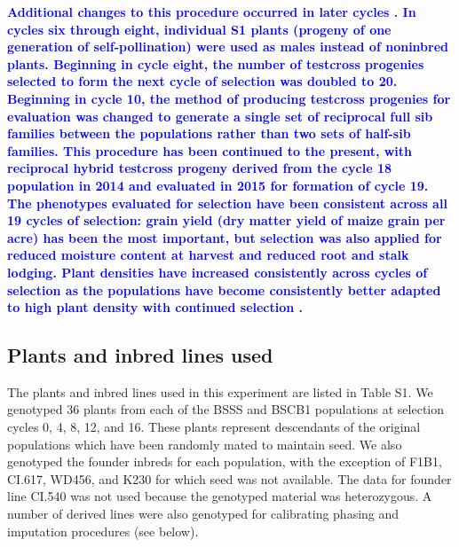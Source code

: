 \documentclass[twocolumn,twoside,letterpaper]{article}
\newcommand{\rev}[1]{\textcolor{blue}{\bf #1}}
\begin{document}
\rev{Additional changes to this procedure occurred in later cycles \citep{penny1971twenty,keeratinijakal1993responses}.
In cycles six through eight, individual S1 plants (progeny of one generation of self-pollination) were used as males instead of noninbred plants.  
Beginning in cycle eight, the number of testcross progenies selected to form the next cycle of selection was doubled to 20.  
Beginning in cycle 10, the method of producing testcross progenies for evaluation was changed to generate a single set of reciprocal full sib families between the populations rather than two sets of half-sib families. %
This procedure has been continued to the present, with reciprocal hybrid testcross progeny derived from the cycle 18 population in 2014 and evaluated in 2015 for formation of cycle 19.  
The phenotypes evaluated for selection have been consistent across all 19 cycles of selection: grain yield (dry matter yield of maize grain per acre) has been the most important, but selection was also applied for reduced moisture content at harvest and reduced root and stalk lodging.  
Plant densities have increased consistently across cycles of selection as the populations have become consistently better adapted to high plant density with continued selection \citep{brekke2011selection}.}

\subsection*{Plants and inbred lines used}
The plants and inbred lines used in this experiment are listed in Table S1. 
We genotyped 36 plants from each of the BSSS and BSCB1 populations at selection cycles 0, 4, 8, 12, and 16. 
These plants represent descendants of the original populations which have been randomly mated to maintain seed. 
We also genotyped the founder inbreds for each population, with the exception of F1B1, CI.617, WD456, and K230 for which seed was not available. 
The data for founder line CI.540 was not used because the genotyped material was heterozygous. 
A number of derived lines were also genotyped for calibrating phasing and imputation procedures (see below).
\end{document}
